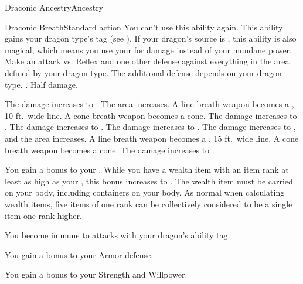 \begin{feat}{Draconic Ancestry}{Ancestry}
    \begin{activeability}{Draconic Breath}{Standard action}
      \abilitycost You \briefly can't use this ability again.
      \rankline
      This ability gains your dragon type's tag (see ).
      If your dragon's source is \magical, this ability is also magical, which means you use your  for damage instead of your mundane power.
      Make an attack vs. Reflex and one other defense against everything in the area defined by your dragon type.
      The additional defense depends on your dragon type.
      \hit \damagerankthree.
      \miss Half damage.

      \rankline
       The damage increases to \damagerankfour.
       The area increases.
      A line breath weapon becomes a \arealarge, 10 ft.\ wide line.
      A cone breath weapon becomes a \areamed cone.
       The damage increases to \damagerankfive.
       The damage increases to \damageranksix.
       The damage increases to \damagerankseven.
       The damage increases to \damagerankeight, and the area increases.
      A line breath weapon becomes a \areagarg, 15 ft.\ wide line.
      A cone breath weapon becomes a \arealarge cone.
       The damage increases to \damageranknine.
    \end{activeability}

     You gain a  bonus to your .
    While you have a wealth item with an item rank at least as high as your , this bonus increases to .
    The wealth item must be carried on your body, including containers on your body.
    As normal when calculating wealth items, five items of one rank can be collectively considered to be a single item one rank higher.

     You become immune to attacks with your dragon's ability tag.

     You gain a  bonus to your Armor defense.

     You gain a  bonus to your Strength and Willpower.
  \end{feat}

